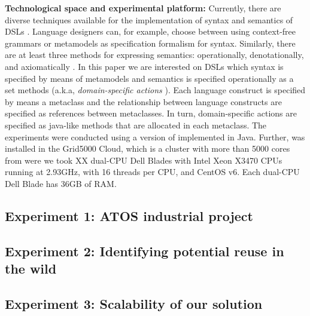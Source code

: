 \textbf{Technological space and experimental platform:} Currently, there are diverse techniques available for the implementation of syntax and semantics of DSLs \cite{Mernik:2005b}. Language designers can, for example, choose between using context-free grammars or metamodels as specification formalism for syntax. Similarly, there are at least three methods for expressing semantics: operationally, denotationally, and axiomatically \cite{Mosses:2001}. In this paper we are interested on DSLs which syntax is specified by means of metamodels and semantics is specified operationally as a set methods (a.k.a, \textit{domain-specific actions} \cite{Combemale:2013}). Each language construct is specified by means a metaclass and the relationship between language constructs are specified as references between metaclasses. In turn, domain-specific actions are specified as java-like methods that are allocated in each metaclass. The experiments were 
conducted using a version of \toolname implemented in Java. Further, 
\toolname was installed in the Grid5000 Cloud, which is a cluster with more than 5000 cores from were we took XX dual-CPU Dell Blades with
Intel Xeon X3470 CPUs running at 2.93GHz, with 16 threads 
per CPU, and CentOS v6. Each dual-CPU Dell Blade has 36GB of RAM. 



\subsection{Experiment 1: ATOS industrial project}

\subsection{Experiment 2: Identifying potential reuse in the wild}
 
\subsection{Experiment 3: Scalability of our solution}
